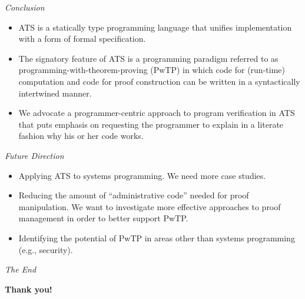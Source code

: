 \documentclass[pdf]{prosper}
\begin{document}
\begin{slide}{\em Conclusion}
\begin{itemize}
\item
ATS is a statically type programming language that unifies implementation
with a form of formal specification.
\item
The signatory feature of ATS is a programming paradigm referred to as
programming-with-theorem-proving (PwTP) in which code for (run-time)
computation and code for proof construction can be written in a
syntactically intertwined manner.
\item
We advocate a programmer-centric approach to program verification
in ATS that puts emphasis on requesting the programmer to explain in
a literate fashion why his or her code works.
\end{itemize}
\end{slide}
\begin{slide}{\em Future Direction}
\begin{itemize}
\item Applying ATS to systems programming. We need more case studies.
\item
Reducing the amount of ``administrative code'' needed for proof
manipulation. We want to investigate more effective approaches to proof
management in order to better support PwTP.
\item
Identifying the potential of PwTP in areas other than systems programming
(e.g., security).
\end{itemize}
\end{slide}
\begin{slide}{\em The End}
\vspace{72pt}
\begin{center}
{\huge\bf Thank you!}
\end{center}
\end{slide}
\end{document}
